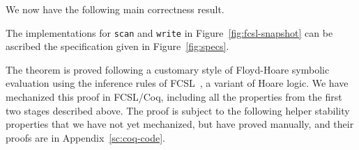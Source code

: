 \begin{comment}
We consider the first item: by Lemma~\ref{lem:inspect}, if
$\aux{inspect}\ t_x\ t_y\ \ordlist\ \C = {\sf Yes}\ x\ t'$ then $t'$
is the yellow timestamp of $\histx$. Then, all elements $t$ in the
chain $t' \tle t \tleq t_y$ belong to $\histy$, by virtue of $t_y$
being yellow or the last green in $\histy$ and
Invariants~\ref{inv:color} and~\ref{inv:redzone}. Thus, in $\ordlist'
= \aux{push}\ t'\ t_y\ \ordlist$, $\forall\ t' \in t_x \tleP t' \tleP
t_y\ldot. t' \in {\histy'}$, hence $(r_x,r_y)$ is a valid snapshot by
$\tleqP$. As for the second item, the proof of the preservation of
most invariants is quite straightforwards, the crux of the matter
being the observation that all $t$ in the chain $t' \tle t
\tle t_y$ are {\it overlapping} and, as a result, changing the linking
of $t'$ in the logical order does not contradict
Proposition~\ref{inv:overlap}.
\end{comment}


We now have the following main correctness result.
\begin{theorem}\label{thm:specs}
The implementations for {\tt scan} and {\tt write} in
Figure~\ref{fig:fcsl-snapshot} can be ascribed the specification given
in Figure~\ref{fig:specs}.
\end{theorem}
%
The theorem is proved following a customary style of Floyd-Hoare
symbolic evaluation using the inference rules of
FCSL~\cite{Nanevski-al:ESOP14}, a variant of Hoare logic. We have
mechanized this proof in FCSL/Coq, including all the properties from
the first two stages described above. The proof is subject to the
following helper stability properties that we have not yet mechanized,
but have proved manually, and their proofs are in
Appendix~\ref{sc:coq-code}.



